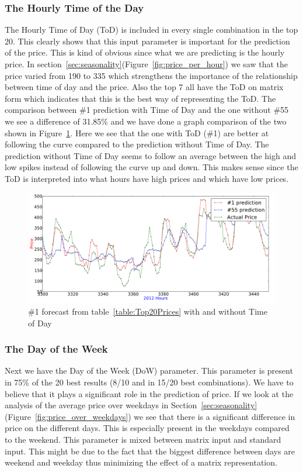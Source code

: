 \subsubsection{The Hourly Time of the Day}
The Hourly Time of Day (ToD) is included in every single combination in the top 20. This clearly shows that this input parameter is important for the prediction of the price. This is kind of obvious since what we are predicting is the hourly price. In section~\ref{sec:seasonality}(Figure~\ref{fig:price_per_hour}) we saw that the price varied from 190 to 335 which strengthens the importance of the relationship between time of day and the price. Also the top 7 all have the ToD on matrix form which indicates that this is the best way of representing the ToD. The comparison between \#1 prediction with Time of Day and the one without \#55 we see a difference of 31.85\% and we have done a graph comparison of the two shown in Figure~\ref{fig:dowComparison}. Here we see that the one with ToD (\#1) are better at following the curve compared to the prediction without Time of Day. The prediction without Time of Day seems to follow an average between the high and low spikes instead of following the curve up and down. This makes sense since the ToD is interpreted into what hours have high prices and which have low prices.

\begin{figure}[H]
\centering
\includegraphics[width=\linewidth]{billeder/PriceExperimentalAnalysis/dowComparison.png}
\caption{\#1 forecast from table~\ref{table:Top20Prices} with and without Time of Day}
\label{fig:dowComparison}
\end{figure}

\subsubsection{The Day of the Week}
Next we have the Day of the Week (DoW) parameter. This parameter is present in 75\% of the 20 best results (8/10 and in 15/20 best combinations). We have to believe that it plays a significant role in the prediction of price. If we look at the analysis of the average price over weekdays in Section~\ref{sec:seasonality} (Figure~\ref{fig:price_over_weekdays}) we see that there is a significant difference in price on the different days. This is especially present in the weekdays compared to the weekend. This parameter is mixed between matrix input and standard input. This might be due to the fact that the biggest difference between days are weekend and weekday thus minimizing the effect of a matrix representation.

